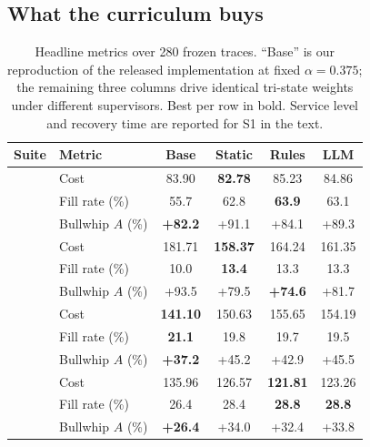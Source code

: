 \documentclass[conference]{IEEEtran}
\begin{document}
\subsection{What the curriculum buys}
\label{sec:res-curr}

\begin{table}[t]
\caption{Headline metrics over 280 frozen traces. ``Base'' is our
reproduction of the released implementation at fixed $\alpha=0.375$; the
remaining three columns drive identical tri-state weights under different
supervisors. Best per row in bold. Service level and recovery time are
reported for S1 in the text.}
\label{tab:main}
\centering
\scriptsize
\setlength{\tabcolsep}{4pt}
\begin{tabular}{@{}llcccc@{}}
\toprule
Suite & Metric & Base & Static & Rules & LLM \\
\midrule
{}
 & Cost              & 83.90 & \textbf{82.78} & 85.23 & 84.86 \\
 & Fill rate (\%)    & 55.7 & 62.8 & \textbf{63.9} & 63.1 \\
 & Bullwhip $A$ (\%) & \textbf{+82.2} & +91.1 & +84.1 & +89.3 \\
\midrule
{}
 & Cost              & 181.71 & \textbf{158.37} & 164.24 & 161.35 \\
 & Fill rate (\%)    & 10.0 & \textbf{13.4} & 13.3 & 13.3 \\
 & Bullwhip $A$ (\%) & +93.5 & +79.5 & \textbf{+74.6} & +81.7 \\
\midrule
{}
 & Cost              & \textbf{141.10} & 150.63 & 155.65 & 154.19 \\
 & Fill rate (\%)    & \textbf{21.1} & 19.8 & 19.7 & 19.5 \\
 & Bullwhip $A$ (\%) & \textbf{+37.2} & +45.2 & +42.9 & +45.5 \\
\midrule
{}
 & Cost              & 135.96 & 126.57 & \textbf{121.81} & 123.26 \\
 & Fill rate (\%)    & 26.4 & 28.4 & \textbf{28.8} & \textbf{28.8} \\
 & Bullwhip $A$ (\%) & \textbf{+26.4} & +34.0 & +32.4 & +33.8 \\
\bottomrule
\end{tabular}
\end{table}
\end{document}
